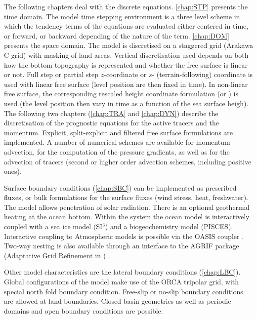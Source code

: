 \documentclass[../main/NEMO_manual]{subfiles}
\begin{document}
The following chapters deal with the discrete equations.
\autoref{chap:STP} presents the time domain.
The model time stepping environment is a three level scheme in which 
the tendency terms of the equations are evaluated either centered in time, or forward, or backward depending of 
the nature of the term.
\autoref{chap:DOM} presents the space domain.
The model is discretised on a staggered grid (Arakawa C grid) with masking of land areas.
Vertical discretisation used depends on both how the bottom topography is represented and whether 
the free surface is linear or not.
Full step or partial step $z$-coordinate or $s$- (terrain-following) coordinate is used with linear free surface 
(level position are then fixed in time).
In non-linear free surface, the corresponding rescaled height coordinate formulation (\zstar or \sstar) is used
(the level position then vary in time as a function of the sea surface heigh).
The following two chapters (\autoref{chap:TRA} and \autoref{chap:DYN}) describe the discretisation of
the prognostic equations for the active tracers and the momentum.
Explicit, split-explicit and filtered free surface formulations are implemented.
A number of numerical schemes are available for momentum advection, 
for the computation of the pressure gradients, as well as for the advection of tracers 
(second or higher order advection schemes, including positive ones).

Surface boundary conditions (\autoref{chap:SBC}) can be implemented as prescribed fluxes, or bulk formulations for 
the surface fluxes (wind stress, heat, freshwater).
The model allows penetration of solar radiation.
There is an optional geothermal heating at the ocean bottom.
Within the \NEMO system the ocean model is interactively coupled with a sea ice model (SI$^3$) and
a biogeochemistry model (PISCES).
Interactive coupling to Atmospheric models is possible via the OASIS coupler \citep{OASIS2006}.
Two-way nesting is also available through an interface to the AGRIF package
(Adaptative Grid Refinement in \fortran) \citep{Debreu_al_CG2008}.

Other model characteristics are the lateral boundary conditions (\autoref{chap:LBC}).
Global configurations of the model make use of the ORCA tripolar grid, with special north fold boundary condition.
Free-slip or no-slip boundary conditions are allowed at land boundaries.
Closed basin geometries as well as periodic domains and open boundary conditions are possible.
\end{document}
